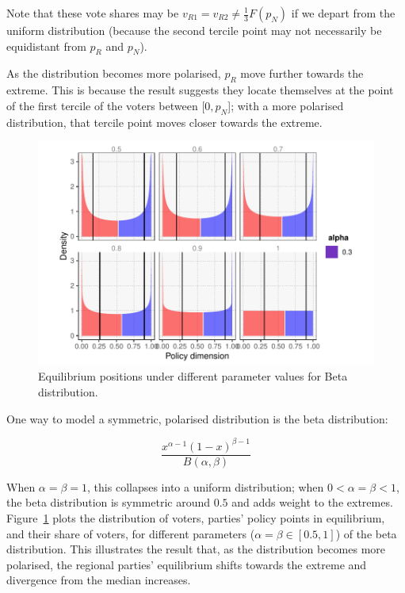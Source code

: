 \documentclass[11pt]{article}
\begin{document}
Note that these vote shares may be $v_{R1} = v_{R2} \neq \frac{1}{3} F(p_N)$ if we depart from the uniform distribution (because the second tercile point may not necessarily be equidistant from $p_R$ and $p_N$).

As the distribution becomes more polarised, $p_R$ move further towards the extreme. This is because the result suggests they locate themselves at the point of the first tercile of the voters between $[0, p_N$]; with a more polarised distribution, that tercile point moves closer towards the extreme.

\begin{figure}
    \centering
    \includegraphics{../../output/polarisation.pdf}
    \caption{Equilibrium positions under different parameter values for Beta distribution.}
    \label{fig:betadist}
\end{figure}

One way to model a symmetric, polarised distribution is the beta distribution:

\begin{equation*}
    \frac{x^{\alpha - 1}(1 - x)^{\beta -1}}{B(\alpha, \beta)}
\end{equation*}

When $\alpha = \beta = 1$, this collapses into a uniform distribution; when $0 < \alpha = \beta < 1$, the beta distribution is symmetric around $0.5$ and adds weight to the extremes. Figure~\ref{fig:betadist} plots the distribution of voters, parties' policy points in equilibrium, and their share of voters, for different parameters ($\alpha = \beta \in [0.5, 1]$) of the beta distribution. This illustrates the result that, as the distribution becomes more polarised, the regional parties' equilibrium shifts towards the extreme and divergence from the median increases.
\end{document}
